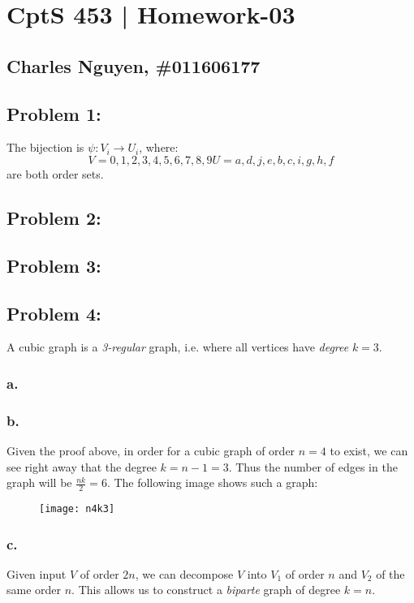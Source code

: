 \documentclass[12pt,letterpaper]{article}
\begin{document}
\section*{CptS 453 | Homework-03 }
\subsection*{Charles Nguyen, \#011606177 }

\subsection*{Problem 1:}


The bijection is $\psi: V_i \rightarrow U_i $, where:
\[
    V = {0,1,2,3,4,5,6,7,8,9}
    U = {a,d,j,e,b,c,i,g,h,f}
\]
are both order sets.

\subsection*{Problem 2:}

\pagebreak

\subsection*{Problem 3:}


\pagebreak
\subsection*{Problem 4:}

A cubic graph is a \emph{3-regular} graph, i.e. where all vertices have
\emph{degree} $k=3$.

\subsubsection*{a.}

\subsubsection*{b.}
Given the proof above, in order for a cubic graph of order $n=4$ to exist, we
can see right away that the degree $k=n-1=3$. Thus the number of edges in the
graph will be $\frac{nk}{2} = 6$. The following image shows such a graph:

\begin{figure}[h]
\texttt{[image: n4k3]}
\centering
\end{figure}

\subsubsection*{c.}
Given input $V$ of order $2n$, we can decompose $V$ into $V_1$ of order $n$
and $V_2$ of the same order $n$.  This allows us to construct a \emph{biparte} graph of degree $k=n$.
\end{document}
